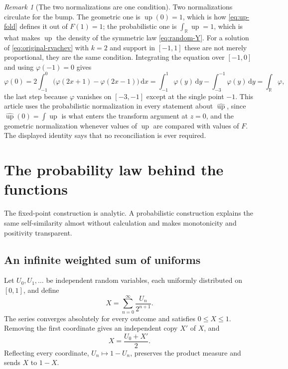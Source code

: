 \documentclass[11pt,oneside]{article}
\theoremstyle{definition}
\theoremstyle{remark}
\newtheorem{remark}[theorem]{Remark}
\newcommand{\R}{\mathbb R}
\newcommand{\Up}{\operatorname{up}}
\newcommand{\dd}{\,\mathrm d}
\begin{document}
\begin{remark}[The two normalizations are one condition]
\label{rem:four-normalizations}
Two normalizations circulate for the bump.  The geometric one is $\Up(0)=1$, which is how
\eqref{eq:up-fold} defines it out of $F(1)=1$; the probabilistic one is
$\int_\R\Up=1$, which is what makes $\Up$ the density of the symmetric law
\eqref{eq:random-Y}.  For a solution of \eqref{eq:original-rvachev} with $k=2$ and support in
$[-1,1]$ these are not merely proportional, they are the same condition.  Integrating the
equation over $[-1,0]$ and using $\varphi(-1)=0$ gives
\begin{equation*}
 \varphi(0)
 =2\int_{-1}^{0}\bigl(\varphi(2x+1)-\varphi(2x-1)\bigr)\dd x
 =\int_{-1}^{1}\varphi(y)\dd y-\int_{-3}^{-1}\varphi(y)\dd y
 =\int_\R\varphi,
\end{equation*}
the last step because $\varphi$ vanishes on $[-3,-1]$ except at the single point $-1$.
This article uses the probabilistic normalization in every statement about
$\widehat{\Up}$, since $\widehat{\Up}(0)=\int\Up$ is what enters the transform argument at
$z=0$, and the geometric normalization whenever values of $\Up$ are compared with values of
$F$.  The displayed identity says that no reconciliation is ever required.
\end{remark}

\section{The probability law behind the functions}
\label{sec:probability}

The fixed-point construction is analytic.  A probabilistic construction explains the same
self-similarity almost without calculation and makes monotonicity and positivity transparent.

\subsection{An infinite weighted sum of uniforms}

Let $U_0,U_1,\ldots$ be independent random variables, each uniformly distributed on
$[0,1]$, and define
\begin{equation}
 X=\sum_{n=0}^{\infty}\frac{U_n}{2^{n+1}}.                \label{eq:random-X}
\end{equation}
The series converges absolutely for every outcome and satisfies $0\le X\le1$.  Removing the
first coordinate gives an independent copy $X'$ of $X$, and
\begin{equation}
 X=\frac{U_0+X'}2.                                         \label{eq:random-split}
\end{equation}
Reflecting every coordinate, $U_n\mapsto1-U_n$, preserves the product measure and sends
$X$ to $1-X$.
\end{document}
